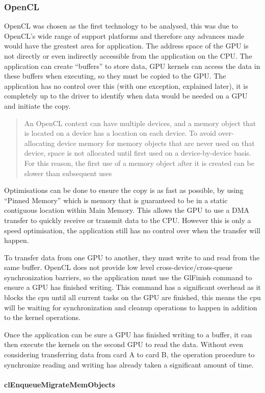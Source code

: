 \documentclass[12pt,a4paper]{article}
\begin{document}
\subsubsection{OpenCL}
OpenCL was chosen as the first technology to be analysed, this was due to OpenCL’s wide range of support platforms and therefore any advances made would have the greatest area for application. The address space of the GPU is not directly or even indirectly accessible from the application on the CPU.
The application can create “buffers” to store data, GPU kernels can access the data in these buffers when executing, so they must be copied to the GPU. The application has no control over this (with one exception, explained later), it is completely up to the driver to identify when data would be needed on a GPU and initiate the copy.
\blockquote[\cite{amdoclguide}]{An OpenCL context can have multiple devices, and a memory object that is located on a device has a location on each device. To avoid over-allocating device memory for memory objects that are never used on that device, space is not allocated until first used on a device-by-device basis. For this reason, the first use of a memory object after it is created can be slower than subsequent uses
}
Optimisations can be done to ensure the copy is as fast as possible, by using “Pinned Memory” which is memory that is guaranteed to be in a static contiguous location within Main Memory. This allows the GPU to use a DMA transfer to quickly receive or transmit data to the CPU. However this is only a speed optimisation, the application still has no control over when the transfer will happen.

To transfer data from one GPU to another, they must write to and read from the same buffer. OpenCL does not provide low level cross-device/cross-queue synchronization barriers, so the application must use the GlFinish command to ensure a GPU has finished writing. This command has a significant overhead as it blocks the cpu until all current tasks on the GPU are finished, this means the cpu will be waiting for synchronization and cleanup operations to happen in addition to the kernel operations. 

Once the application can be sure a GPU has finished writing to a buffer, it can then execute the kernels on the second GPU to read the data. Without even considering transferring data from card A to card B, the operation procedure to synchronize reading and writing has already taken a significant amount of time. 

\paragraph{clEnqueueMigrateMemObjects}
\end{document}
